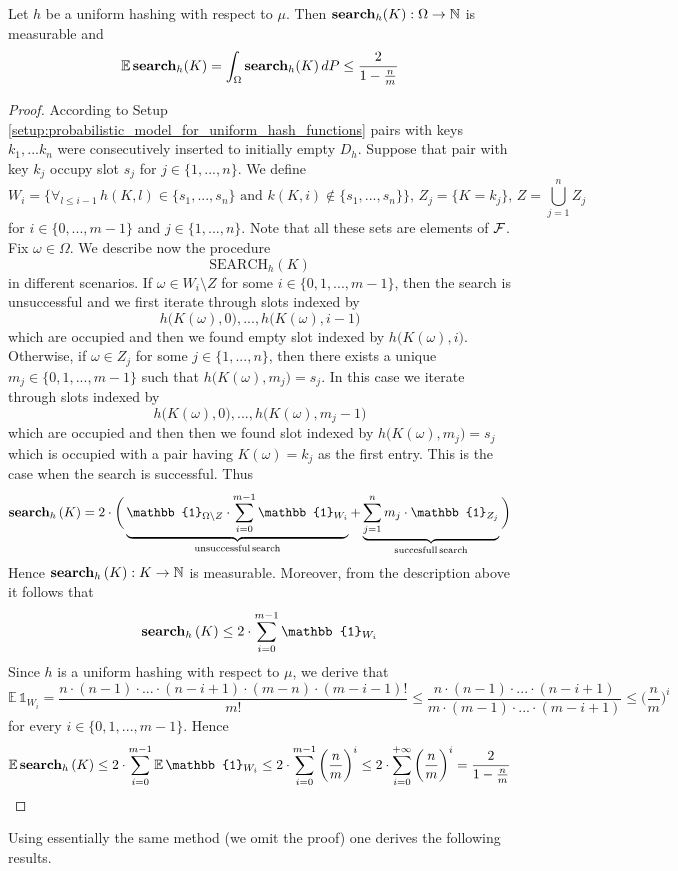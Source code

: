 \begin{theorem}\label{theorem:open_addressing_under_uniform_hashing_analysis_of_search}
Let $h$ be a uniform hashing with respect to $\mu$. Then $\mathbf{search}_h(K):\Omega \rightarrow {\mathbb N}$ is measurable and
$$\mathbb{E}\,\mathbf{search}_h(K) = \int_{\Omega}\mathbf{search}_h(K)\,dP \leq \frac{2}{1 - \frac{n}{m}}$$
\end{theorem}
\begin{proof}
According to Setup \ref{setup:probabilistic_model_for_uniform_hash_functions} pairs with keys $k_1,...k_n$ were consecutively inserted to initially empty $D_h$. Suppose that pair with key $k_j$ occupy slot $s_j$ for $j\in \{1,...,n\}$. We define
$$W_i = \big\{\forall_{l\leq i-1}\,h(K,l)\in \{s_1,...,s_n\}\mbox{ and }k(K,i) \not \in \{s_1,...,s_n\}\big\},\,Z_{j} = \big\{K = k_j\big\},\,Z = \bigcup_{j=1}^nZ_j$$
for $i\in \{0,...,m-1\}$ and $j\in \{1,...,n\}$. Note that all these sets are elements of ${\mathcal F}$. Fix $\omega \in \Omega$. We describe now the procedure
$$\mathrm{SEARCH}_h(K)$$
in different scenarios. If $\omega \in W_i\setminus Z$ for some $i\in \{0,1,...,m-1\}$, then the search is unsuccessful and we first iterate through slots indexed by
$$h\big(K(\omega),0\big),...,h\big(K(\omega), i-1\big)$$
which are occupied and then we found empty slot indexed by $h\big(K(\omega),i\big)$. Otherwise, if $\omega \in Z_j$ for some $j\in \{1,...,n\}$, then there exists a unique $m_j\in \{0,1,...,m-1\}$ such that $h\big(K(\omega),m_j\big) = s_j$. In this case we iterate through slots indexed by
$$h\big(K(\omega),0\big),...,h\big(K(\omega), m_j-1\big)$$
which are occupied and then then we found slot indexed by $h\big(K(\omega),m_j\big) = s_j$ which is occupied with a pair having $K(\omega) = k_j$ as the first entry. This is the case when the search is successful. Thus
$$\bd{search}_h\left(K\right) = 2 \cdot \bigg(\underbrace{\mathbb{1}_{\Omega\setminus Z}\cdot\sum_{i=0}^{m-1} \mathbb{1}_{W_{i}}}_{\mathrm{unsuccessful\,search}} + \underbrace{\sum_{j=1}^n m_j\cdot \mathbb{1}_{Z_j}}_{\mathrm{succesfull\,search}}\bigg)$$
Hence $\mathbf{search}_h\left(K\right):K\rightarrow {\mathbb N}$ is measurable. Moreover, from the description above it follows that
$$\bd{search}_h\left(K\right) \leq 2 \cdot \sum_{i=0}^{m-1} \mathbb{1}_{W_{i}}$$
Since $h$ is a uniform hashing with respect to $\mu$, we derive that
$$\mathbb{E}\,\mathbb{1}_{W_{i}} = \frac{n\cdot (n-1)\cdot ...\cdot (n-i+1) \cdot (m-n) \cdot (m - i - 1)!}{m!} \leq \frac{n\cdot (n-1)\cdot ...\cdot (n- i + 1)}{m\cdot (m-1)\cdot ...\cdot (m - i + 1)}\leq \bigg(\frac{n}{m}\bigg)^i$$
for every $i\in \{0,1,...,m-1\}$. Hence
$$\mathbb{E}\,\bd{search}_h\left(K\right) \leq 2 \cdot \sum_{i=0}^{m-1} \mathbb{E}\,\mathbb{1}_{W_{i}} \leq 2\cdot \sum_{i=0}^{m-1}\bigg(\frac{n}{m}\bigg)^i \leq 2\cdot \sum_{i=0}^{+\infty}\bigg(\frac{n}{m}\bigg)^i = \frac{2}{1 - \frac{n}{m}}$$ 
\end{proof}
\noindent
Using essentially the same method (we omit the proof) one derives the following results.

